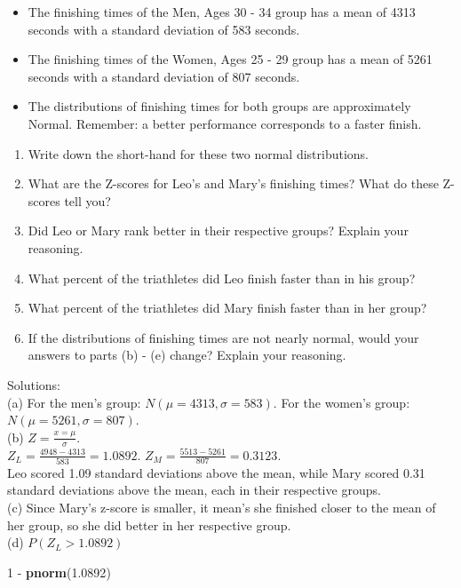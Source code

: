 \documentclass[]{article}
\newenvironment{Shaded}{\begin{snugshade}}{\end{snugshade}}
\newcommand{\KeywordTok}[1]{\textcolor[rgb]{0.13,0.29,0.53}{\textbf{{#1}}}}
\newcommand{\DecValTok}[1]{\textcolor[rgb]{0.00,0.00,0.81}{{#1}}}
\newcommand{\FloatTok}[1]{\textcolor[rgb]{0.00,0.00,0.81}{{#1}}}
\newcommand{\StringTok}[1]{\textcolor[rgb]{0.31,0.60,0.02}{{#1}}}
\newcommand{\NormalTok}[1]{{#1}}
\providecommand{\tightlist}{%
  \setlength{\itemsep}{0pt}\setlength{\parskip}{0pt}}
\begin{document}
\begin{itemize}
\item
  The finishing times of the Men, Ages 30 - 34 group has a mean of 4313
  seconds with a standard deviation of 583 seconds.
\item
  The finishing times of the Women, Ages 25 - 29 group has a mean of
  5261 seconds with a standard deviation of 807 seconds.
\item
  The distributions of finishing times for both groups are approximately
  Normal. Remember: a better performance corresponds to a faster finish.
\end{itemize}

\begin{enumerate}
\def\labelenumi{(\alph{enumi})}
\tightlist
\item
  Write down the short-hand for these two normal distributions.
\item
  What are the Z-scores for Leo's and Mary's finishing times? What do
  these Z-scores tell you?
\item
  Did Leo or Mary rank better in their respective groups? Explain your
  reasoning.
\item
  What percent of the triathletes did Leo finish faster than in his
  group?
\item
  What percent of the triathletes did Mary finish faster than in her
  group?
\item
  If the distributions of finishing times are not nearly normal, would
  your answers to parts (b) - (e) change? Explain your reasoning.
\end{enumerate}

Solutions:\\
(a) For the men's group: \(N(\mu = 4313, \sigma = 583)\). For the
women's group: \(N(\mu = 5261, \sigma = 807)\).\\
(b) \(Z = \frac{x=\mu}{\sigma}.\)\\
\(Z_L = \frac{4948-4313}{583} = 1.0892\).
\(Z_M = \frac{5513-5261}{807} = 0.3123\).\\
Leo scored 1.09 standard deviations above the mean, while Mary scored
0.31 standard deviations above the mean, each in their respective
groups.\\
(c) Since Mary's z-score is smaller, it mean's she finished closer to
the mean of her group, so she did better in her respective group.\\
(d) \(P(Z_L > 1.0892)\)

\begin{Shaded}
\begin{Highlighting}[]
\DecValTok{1} \NormalTok{-}\StringTok{ }\KeywordTok{pnorm}\NormalTok{(}\FloatTok{1.0892}\NormalTok{)}
\end{Highlighting}
\end{Shaded}
\end{document}
